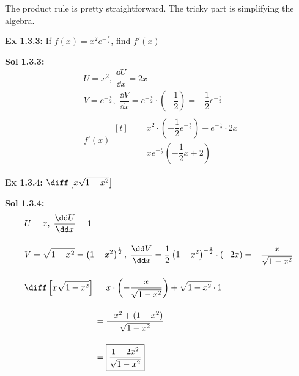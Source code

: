 The product rule is pretty straightforward. The tricky part is simplifying the algebra. \par

\begin{tcolorbox}[example]
    \textbf{Ex 1.3.3: } If $f(x) = x^2e^{-\frac{x}{2}}$, find $f'(x)$ 
\end{tcolorbox}
\begin{tcolorbox}[solution]
    \textbf{Sol 1.3.3: } \begin{align*}
        & U = x^2, \; \dfrac{\dd U}{\dd x} = 2x \\[11pt]
        & V = e^{-\frac{x}{2}}, \; \dfrac{\dd V}{\dd x} = e^{-\frac{x}{2}} \cdot \left(-\dfrac{1}{2}\right) = -\dfrac{1}{2}e^{-\frac{x}{2}} \\[11pt]
        & f'(x) \begin{aligned}[t]
            & = x^2 \cdot \left(-\dfrac{1}{2}e^{-\frac{x}{2}}\right) + e^{-\frac{x}{2}} \cdot 2x \\[11pt]
            & = \boxed{xe^{-\frac{x}{2}}\left(-\dfrac{1}{2}x + 2\right)}
        \end{aligned}
    \end{align*}
\end{tcolorbox} \vspace{11pt}

\begin{tcolorbox}[example]
    \textbf{Ex 1.3.4: } $\diff \left[x\sqrt{1 - x^2}\right]$ 
\end{tcolorbox}
\begin{tcolorbox}[solution]
    \textbf{Sol 1.3.4: } \begin{align*}
        & U = x, \; \dfrac{\dd U}{\dd x} = 1 \\[11pt]
        & V = \sqrt{1 - x^2} = \left(1 - x^2\right)^\frac{1}{2}, \; \dfrac{\dd V}{\dd x} = \dfrac{1}{2}\left(1 - x^2\right)^{-\frac{1}{2}} \cdot (-2x) = -\dfrac{x}{\sqrt{1 - x^2}} \\[11pt]
        & \diff \left[x\sqrt{1 - x^2}\right] \begin{aligned}[t]
            & = x \cdot \left(-\dfrac{x}{\sqrt{1 - x^2}}\right) + \sqrt{1 - x^2} \cdot 1 \\[11pt]
            & = \dfrac{-x^2 + (1 - x^2)}{\sqrt{1 - x^2}} \\[11pt]
            & = \boxed{\dfrac{1 - 2x^2}{\sqrt{1 - x^2}}}
        \end{aligned}
    \end{align*}
\end{tcolorbox} \vspace{11pt}

